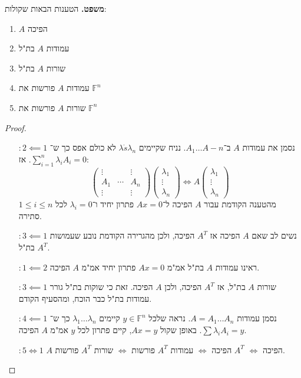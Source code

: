 \documentclass[]{article}
\newcommand\F         {\mathbb{F}}
\newcommand\co        {\colon}
\renewcommand\lg      {\lambda}
\begin{document}
	\textbf{משפט. }הטענות הבאות שקולות: 
	\begin{enumerate}
		\item $A$ הפיכה
		\item עמודות $A$ בת"ל
		\item שורות $A$ בת"ל
		\item עמודות $A$ פורשות את $\F^n$
		\item שורות $A$ פורשות את $\F^n$
	\end{enumerate}
	
	\begin{proof}\,
		\begin{enumerate}
			\item[$\co 2 \impliedby 1$] נסמן את עמודות $A$ ב־$A_1 \dots A-n$. נניח שקיימים $\lg \dot s\lg_n$ לא כולם אפס כך ש־$\sum_{i = 1}^{n}\lg_iA_i = 0$. אז: 
			\[ \begin{pmatrix}
				\vdots && \vdots \\ A_1 & \cdots & A_n \\ \vdots && \vdots
			\end{pmatrix}\begin{pmatrix}
				\lg_1 \\ \vdots \\ \lg_n
			\end{pmatrix} \iff A\begin{pmatrix}
				\lg_1 \\ \vdots \\ \lg_n
			\end{pmatrix} \]
			מהטענה הקודמת עבור $A$ הפיכה ל־$Ax = 0$ פתרון יחיד ו־$\lg_i = 0$ לכל $1 \le i \le n$ סתירה. 
			\item[$\co 3 \impliedby 1$] נשים לב שאם $A$ הפיכה אז $A^T$ הפיכה, ולכן מהגרירה הקודמת נובע שעמושות $A^T$ בת"ל. 
			\item[$\co 1 \impliedby 2$] ראינו עמודות $A$ בת"ל אמ"מ $Ax = 0$ פתרון יחיד אמ"מ $A$ הפיכה. 
			\item[$\co 3 \impliedby 1$] שורות $A$ בת"ל, אז $A^T$ הפיכה, ולכן $A$ הפיכה. זאת כי שוקות בת"ל גורר עמודות בת"ל כבר הוכח, ומהסעיף הקודם. 
			\item[$\co 4 \impliedby 1$] נסמן עמודות $A = A_1 \dots A_n$. נראה שלכל $y \in \F^n$ קיימים $\lg_1 \dots \lg_n$ כך ש־$\sum \lg_iA_i = y$. באופן שקול $Ax = y$, קיים פתרון לכל $y$ אמ"מ $A$ הפיכה. 
			\item[$\co 5 \iff 1$]$A$ הפיכה $\iff$ $A^T$ הפיכה $\iff$ עמודות $A^T$ פורשות $\iff$ שורות $A^T$ פורשות. 
		\end{enumerate}
	\end{proof}
	
\end{document}
